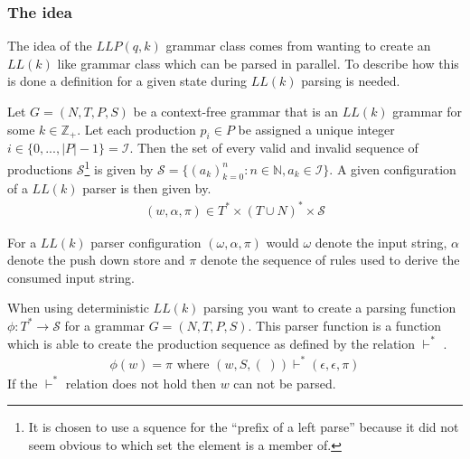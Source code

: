 \subsubsection{The idea}
The idea of the $LLP(q, k)$ grammar class comes from wanting to create an $LL(k)$ like grammar class which can be parsed in parallel. To describe how this is done a definition for a given state during $LL(k)$ parsing is needed.
\begin{definition}
    \label{def:configuration}
    Let $G = (N, T, P, S)$ be a context-free grammar that is an $LL(k)$ grammar for some $k \in \mathbb{Z}_+$. Let each production $p_i \in P$ be assigned a unique integer $i \in \{0, ..., |P| - 1\} = \mathcal{I}$. Then the set of every valid and invalid sequence of productions $\mathcal{S}$\footnote{It is chosen to use a squence for the ``prefix of  a left parse'' \cite[5]{Vagner2007} because it did not seem obvious to which set the element is a member of.} is given by $\mathcal{S} = \{(a_k)_{k=0}^n : n \in \mathbb{N}, a_k \in \mathcal{I}\}$. A given configuration \cite[p. 5]{Vagner2007} of a $LL(k)$ parser is then given by.
    \begin{align*}
        (w, \alpha, \pi) \in T^* \times (T \cup N)^* \times \mathcal{S}
    \end{align*}
\end{definition}
\noindent For a $LL(k)$ parser configuration $(\omega, \alpha, \pi)$ would $\omega$ denote the input string, $\alpha$ denote the push down store and $\pi$ denote the sequence of rules used to derive the consumed input string.

When using deterministic $LL(k)$ parsing you want to create a parsing function $\phi: T^* \to \mathcal{S}$ for a grammar $G = (N, T, P, S)$. This parser function is a function which is able to create the production sequence as defined by the relation $\vdash^*$ \cite[6]{Vagner2007}.
\begin{align*}
    \phi(w) = \pi \text{ where } (w, S, (\;)) \vdash^* (\epsilon, \epsilon, \pi) 
\end{align*}
If the $\vdash^*$ relation does not hold then $w$ can not be parsed. 

